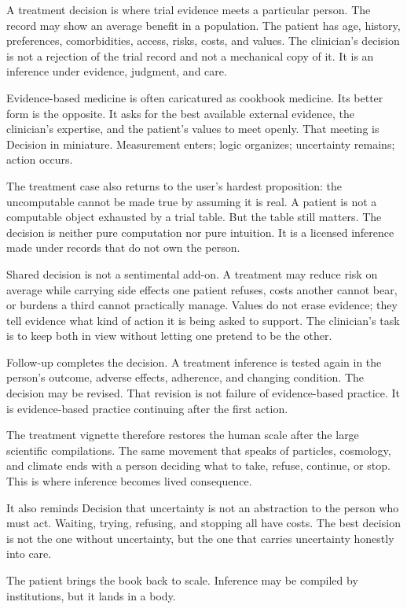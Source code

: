 A treatment decision is where trial evidence meets a particular person. The
record may show an average benefit in a population. The patient has age,
history, preferences, comorbidities, access, risks, costs, and values. The
clinician's decision is not a rejection of the trial record and not a
mechanical copy of it. It is an inference under evidence, judgment, and care.

Evidence-based medicine is often caricatured as cookbook medicine. Its better
form is the opposite. It asks for the best available external evidence, the
clinician's expertise, and the patient's values to meet openly. That meeting
is Decision in miniature. Measurement enters; logic organizes; uncertainty
remains; action occurs.

The treatment case also returns to the user's hardest proposition: the
uncomputable cannot be made true by assuming it is real. A patient is not a
computable object exhausted by a trial table. But the table still matters.
The decision is neither pure computation nor pure intuition. It is a licensed
inference made under records that do not own the person.

Shared decision is not a sentimental add-on. A treatment may reduce risk on
average while carrying side effects one patient refuses, costs
another cannot bear, or burdens a third cannot practically manage. Values do
not erase evidence; they tell evidence what kind of action it is being asked
to support. The clinician's task is to keep both in view without letting one
pretend to be the other.

Follow-up completes the decision. A treatment inference is tested again in
the person's outcome, adverse effects, adherence, and changing condition. The
decision may be revised. That revision is not failure of evidence-based
practice. It is evidence-based practice continuing after the first action.

The treatment vignette therefore restores the human scale after the large
scientific compilations. The same movement that speaks of particles,
cosmology, and climate ends with a person deciding what to take, refuse,
continue, or stop. This is where inference becomes lived consequence.

It also reminds Decision that uncertainty is not an abstraction to the
person who must act. Waiting, trying, refusing, and stopping all have costs.
The best decision is not the one without uncertainty, but the one that carries
uncertainty honestly into care.

The patient brings the book back to scale. Inference may be compiled by
institutions, but it lands in a body.


